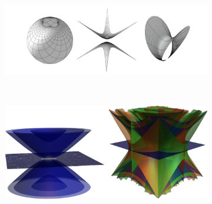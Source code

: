 \documentclass[aspectratio=169]{beamer}
\begin{document}
    \begin{frame}{}
\vfill
\begin{figure}[H]
     \centering
     \begin{subfigure}[b]{.7\textwidth}
         \centering
    	\includegraphics[width=\textwidth]{weierstrass_enneper.png}
     \end{subfigure}
     \\
     \begin{subfigure}[b]{.7\textwidth}
         \centering
         \includegraphics[width=\textwidth]{conformal.png}
     \end{subfigure}
\end{figure}
\vfill
    \end{frame}
\end{document}
